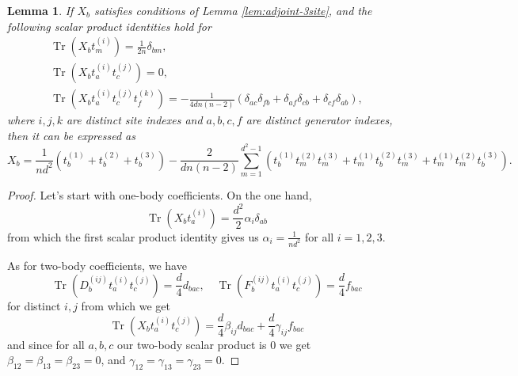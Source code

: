 \documentclass[10pt,twocolumn,superscriptaddress,aps,amsmath,amssymb,citeautoscript,floatfix,prx]{revtex4-2}
\theoremstyle{plain}
\theoremstyle{plain}
\theoremstyle{plain}
\theoremstyle{plain}
\theoremstyle{plain}
\theoremstyle{plain}
\theoremstyle{plain}
\newtheorem{smlemma}[smtheorem]{Lemma}
\theoremstyle{definition}
\theoremstyle{plain}
\begin{document}
\begin{appendix}
\begin{smlemma}\label{lem:covar_3-site_vector_operator}
    If $X_b$ satisfies conditions of Lemma \ref{lem:adjoint-3site}, and the following scalar product identities hold for 
    \[
        \begin{gathered}
            \operatorname{Tr}\left(X_b t_m^{(i)}\right)=\frac{1}{2 n} \delta_{b m},\\
            \operatorname{Tr}\left(X_b t_a^{(i)} t_c^{(j)}\right)=0,\\
            \operatorname{Tr}\left(X_b t_a^{(i)} t_c^{(j)} t_f^{(k)}\right)=-\frac{1}{4 d n (n-2)}\left(\delta_{a c} \delta_{f b} + \delta_{a f} \delta_{c b} + \delta_{c f} \delta_{a b}\right),
        \end{gathered}
    \]
    where $i, j, k$ are distinct site indexes and $a, b, c, f$ are distinct generator indexes,
    then it can be expressed as
    \[
        X_b=\frac{1}{n d^2}\left(t_b^{(1)}+t_b^{(2)}+t_b^{(3)}\right)-\frac{2}{d n(n-2)} \sum_{m=1}^{d^2-1}\left(t_b^{(1)} t_m^{(2)} t_m^{(3)}+t_m^{(1)} t_b^{(2)} t_m^{(3)}+t_m^{(1)} t_m^{(2)} t_b^{(3)}\right).
    \]
\end{smlemma}

\begin{proof}
Let's start with one-body coefficients. On the one hand,
\[
    \operatorname{Tr}\left(X_b t_a^{(i)}\right)=\frac{d^2}{2} \alpha_i \delta_{a b}
\]
from which the first scalar product identity gives us $\alpha_i=\frac{1}{n d^2}$ for all $i=1,2,3$. 

As for two-body coefficients, we have
\[
    \operatorname{Tr}\left(D_b^{(i j)} t_a^{(i)} t_c^{(j)}\right)=\frac{d}{4} d_{b a c}, \quad \operatorname{Tr}\left(F_b^{(i j)} t_a^{(i)} t_c^{(j)}\right)=\frac{d}{4} f_{b a c}
\]
for distinct $i, j$ from which we get
\[
    \operatorname{Tr}\left(X_b t_a^{(i)} t_c^{(j)}\right)=\frac{d}{4} \beta_{i j} d_{b a c}+\frac{d}{4} \gamma_{i j} f_{b a c}
\]
and since for all $a, b, c$ our two-body scalar product is $0$ we get $\beta_{12}=\beta_{13}=\beta_{23}=0$, and $\gamma_{12}=\gamma_{13}=\gamma_{23}=0$. 


\end{proof}
\end{appendix}
\end{document}
